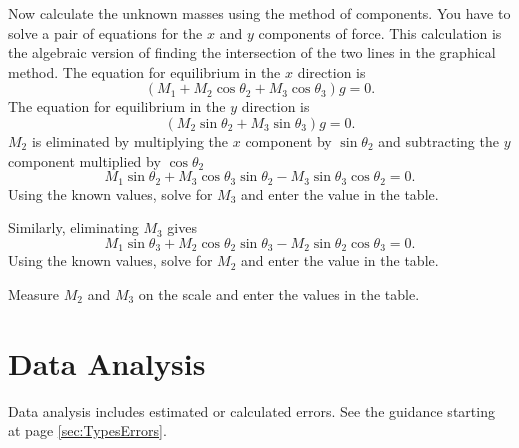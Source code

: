 Now calculate the unknown masses using the method of components.
You have to solve a pair of equations for the $x$ and $y$ components of force.
This calculation is the algebraic version of finding the intersection of the two lines in the graphical method.
The equation for equilibrium in the $x$ direction is
\begin{equation}
  \label{eq:M01unknownx}
  (M_1 + M_2 \cos\theta_2 + M_3 \cos\theta_3)g = 0.
\end{equation}
The equation for equilibrium in the $y$ direction is
\begin{equation}
  \label{eq:M01unknowny}
  (M_2 \sin\theta_2 + M_3 \sin\theta_3)g = 0.
\end{equation}
$M_2$ is eliminated by multiplying the $x$ component by $\sin \theta_2$ and subtracting the $y$ component multiplied by $\cos \theta_2$
\begin{equation}
  \label{eq:M01solveM3}
  M_1 \sin \theta_2  + M_3 \cos \theta_3 \sin \theta_2 - M_3 \sin \theta_3 \cos \theta_2 = 0.
\end{equation}
Using the known values, solve for $M_3$ and enter the value in the table.

Similarly, eliminating $M_3$ gives
\begin{equation}
  \label{eq:M01solveM2}
  M_1 \sin \theta_3  + M_2 \cos \theta_2 \sin \theta_3 - M_2 \sin \theta_2 \cos \theta_3 = 0.
\end{equation}
Using the known values, solve for $M_2$ and enter the value in the table.

Measure $M_2$ and $M_3$ on the scale and enter the values in the table.














\section{Data Analysis}

Data analysis includes estimated or calculated errors. See the guidance starting at page \ref{sec:TypesErrors}.

